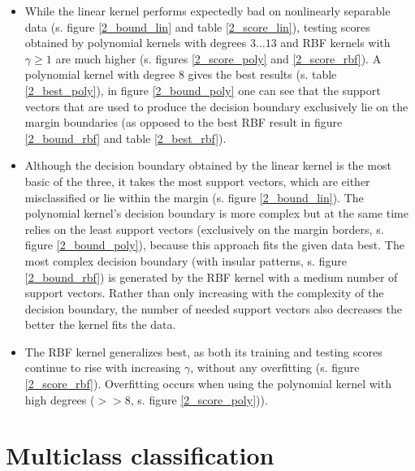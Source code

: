 \documentclass{article}
\begin{document}
\begin{itemize}
\item While the linear kernel performs expectedly bad on nonlinearly separable data (s. figure \ref{2_bound_lin} and table \ref{2_score_lin}), testing scores obtained by polynomial kernels with degrees $3 \dots 13$ and RBF kernels with $\gamma \geq 1 $ are much higher (s. figures \ref{2_score_poly} and \ref{2_score_rbf}). A polynomial kernel with degree $8$ gives the best results (s. table \ref{2_best_poly}), in figure \ref{2_bound_poly} one can see that the support vectors that are used to produce the decision boundary exclusively lie on the margin boundaries (as opposed to the best RBF result in figure \ref{2_bound_rbf} and table \ref{2_best_rbf}).

\item Although the decision boundary obtained by the linear kernel is the most basic of the three, it takes the most support vectors, which are either misclassified or lie within the margin (s. figure \ref{2_bound_lin}). The polynomial kernel's decision boundary is more complex but at the same time relies on the least support vectors (exclusively on the margin borders, s. figure \ref{2_bound_poly}), because this approach fits the given data best. The most complex decision boundary (with insular patterns, s. figure \ref{2_bound_rbf}) is generated by the RBF kernel with a medium number of support vectors. Rather than only increasing with the complexity of the decision boundary, the number of needed support vectors also decreases the better the kernel fits the data.

\item The RBF kernel generalizes best, as both its training and testing scores continue to rise with increasing $\gamma$, without any overfitting (s. figure \ref{2_score_rbf}). Overfitting occurs when using the polynomial kernel with high degrees ($>>8$, s. figure \ref{2_score_poly})).

\end{itemize}

\clearpage
\section{Multiclass classification}

\subsection{}

\subsection{}
\end{document}
